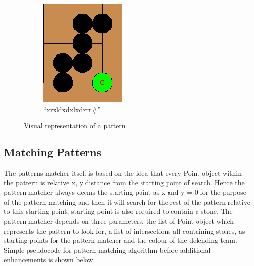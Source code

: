 \documentclass{l4proj}
\begin{document}
\begin{figure}[!ht]
\centering
\begin{subfigure}[b]{0.2\textwidth}
\includegraphics[width=\textwidth]{pat/1.png}
\caption{“xrxldxdxlxdxrr\#”}
\label{fig:pat-1a}
\end{subfigure}
\caption{Visual representation of a pattern}
\label{fig:pat-1}
\end{figure}

\subsection{Matching Patterns}

The patterns matcher itself is based on the idea that every Point object within the pattern is relative x, y distance from the starting point of search. Hence the pattern matcher always deems the starting point as x and y = 0 for the purpose of the pattern matching and then it will search for the rest of the pattern relative to this starting point, starting point is also required to contain a stone. The pattern matcher depends on three parameters, the list of Point object which represents the pattern to look for, a list of intersections all containing stones, as starting points for the pattern matcher and the colour of the defending team. Simple pseudocode for pattern matching algorithm before additional enhancements is shown below.
\end{document}
